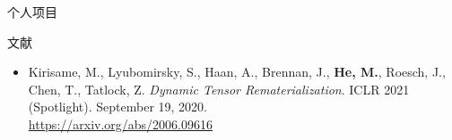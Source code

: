 \documentclass{resume}
\begin{document}
\begin{rSection}{个人项目}




	\end{rSection}
	\vspace{-5pt}

	\begin{rSection}{文献}
		\begin{itemize}
			\item Kirisame, M., Lyubomirsky, S., Haan, A., Brennan, J., \textbf{He, M.}, Roesch, J., Chen, T., Tatlock, Z. \textit{Dynamic Tensor Rematerialization}. ICLR 2021 (Spotlight). September 19, 2020.\\ \href{https://arxiv.org/abs/2006.09616}{https://arxiv.org/abs/2006.09616}
		\end{itemize}
	\end{rSection}
	
\end{document}
